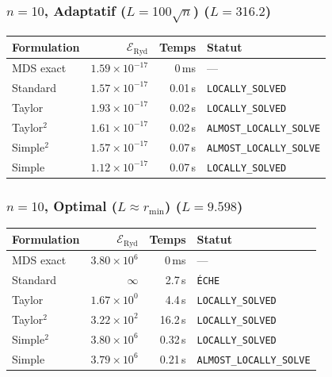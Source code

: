 \subsubsection{$n=10$, Adaptatif ($L{=}100\sqrt{n}$) ($L=316.2$)}
\begin{longtable}{@{}lrrl@{}}
  \toprule
  Formulation & $\mathcal{E}_{\mathrm{Ryd}}$ & Temps & Statut \\
  \midrule
  \endhead
  MDS exact & $1.59\times10^{-17}$ & 0\,ms & --- \\
  Standard & $1.57\times10^{-17}$ & 0.01\,s & \texttt{LOCALLY\_SOLVED} \\
  Taylor & $1.93\times10^{-17}$ & 0.02\,s & \texttt{LOCALLY\_SOLVED} \\
  Taylor$^2$ & $1.61\times10^{-17}$ & 0.02\,s & \texttt{ALMOST\_LOCALLY\_SOLVE} \\
  Simple$^2$ & $1.57\times10^{-17}$ & 0.07\,s & \texttt{ALMOST\_LOCALLY\_SOLVE} \\
  Simple & $1.12\times10^{-17}$ & 0.07\,s & \texttt{LOCALLY\_SOLVED} \\
  \bottomrule
\end{longtable}

\subsubsection{$n=10$, Optimal ($L{\approx}r_{\min}$) ($L=9.598$)}
\begin{longtable}{@{}lrrl@{}}
  \toprule
  Formulation & $\mathcal{E}_{\mathrm{Ryd}}$ & Temps & Statut \\
  \midrule
  \endhead
  MDS exact & $3.80\times10^{6}$ & 0\,ms & --- \\
  Standard & $\infty$ & 2.7\,s & \texttt{ÉCHE} \\
  Taylor & $1.67\times10^{0}$ & 4.4\,s & \texttt{LOCALLY\_SOLVED} \\
  Taylor$^2$ & $3.22\times10^{2}$ & 16.2\,s & \texttt{LOCALLY\_SOLVED} \\
  Simple$^2$ & $3.80\times10^{6}$ & 0.32\,s & \texttt{LOCALLY\_SOLVED} \\
  Simple & $3.79\times10^{6}$ & 0.21\,s & \texttt{ALMOST\_LOCALLY\_SOLVE} \\
  \bottomrule
\end{longtable}

